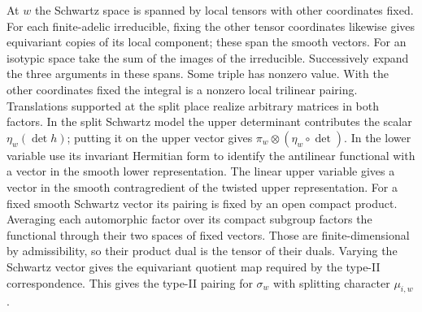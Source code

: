 At $w$ the Schwartz space is spanned by local tensors with
other coordinates fixed. For each finite-adelic irreducible,
fixing the other tensor coordinates likewise gives equivariant
copies of its local component; these span the smooth vectors.
For an isotypic space take the sum of the images of the irreducible.
Successively expand the three arguments in these spans. Some triple
has nonzero value. With the other coordinates fixed the integral is
a nonzero local trilinear pairing. Translations supported at the split
place realize arbitrary matrices in both factors. In the split
Schwartz model the upper determinant contributes the scalar
$\eta_w(\det h)$; putting it on the upper vector gives
$\pi_w\otimes(\eta_w\circ\det)$. In the lower variable use its invariant Hermitian form to
identify the antilinear functional with a vector in the smooth
lower representation. The linear upper variable gives a vector in
the smooth contragredient of the twisted upper representation.
For a fixed smooth Schwartz vector its pairing is fixed by an
open compact product. Averaging each automorphic factor over its
compact subgroup factors the functional through their two spaces
of fixed vectors. Those are finite-dimensional by admissibility,
so their product dual is the tensor of their duals. Varying the
Schwartz vector gives the equivariant quotient map required by
the type-II correspondence. This gives the type-II pairing for $\sigma_w$ with splitting character
$\mu_{i,w}$.

